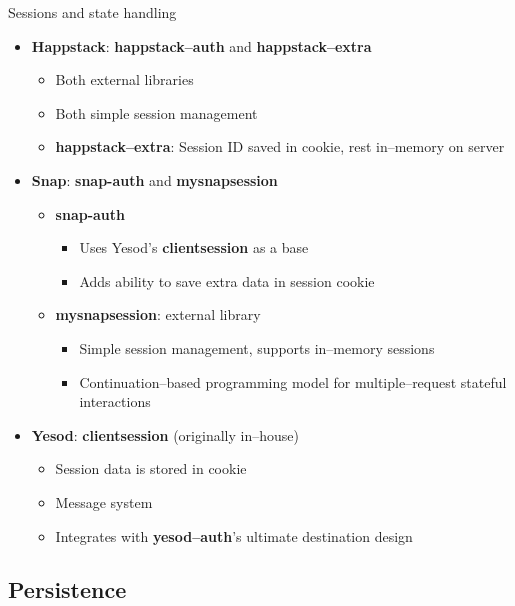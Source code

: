 \documentclass[10pt,usenames,dvipsnames]{beamer}
\begin{document}
	\begin{frame}{Sessions and state handling}
		\begin{itemize}
		\item \textbf{Happstack}: \textbf{happstack--auth} and \textbf{happstack--extra}
		\begin{itemize}
			\item Both external libraries
			\item Both simple session management
			\item \textbf{happstack--extra}: Session ID saved in cookie, rest in--memory on server
		\end{itemize}
		\item\textbf{Snap}: \textbf{snap-auth} and \textbf{mysnapsession}
		\begin{itemize}
			\item  \textbf{snap-auth}
			\begin{itemize}
				\item Uses Yesod's \textbf{clientsession} as a base
				\item Adds ability to save extra data in session cookie
			\end{itemize}
			\item  \textbf{mysnapsession}: external library
			\begin{itemize}
				\item Simple session management, supports in--memory sessions
				\item Continuation--based programming model for multiple--request stateful interactions
			\end{itemize}
		\end{itemize}
		\item \textbf{Yesod}: \textbf{clientsession} (originally in--house)
		\begin{itemize}
			\item Session data is stored in cookie
			\item Message system
			\item Integrates with \textbf{yesod--auth}'s ultimate destination design
		\end{itemize}
		\end{itemize}		
	\end{frame}	
	
	\subsection*{Persistence}
	
\end{document}
